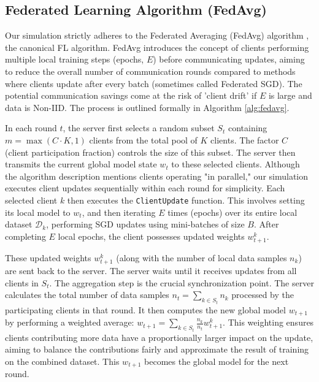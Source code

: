 \documentclass[conference]{IEEEtran}
\begin{document}
\subsection{Federated Learning Algorithm (FedAvg)}
Our simulation strictly adheres to the Federated Averaging (FedAvg) algorithm \cite{b2}, the canonical FL algorithm. FedAvg introduces the concept of clients performing multiple local training steps (epochs, $E$) before communicating updates, aiming to reduce the overall number of communication rounds compared to methods where clients update after every batch (sometimes called Federated SGD). The potential communication savings come at the risk of 'client drift' if $E$ is large and data is Non-IID. The process is outlined formally in Algorithm \ref{alg:fedavg}.

In each round $t$, the server first selects a random subset $S_t$ containing $m = \max(C \cdot K, 1)$ clients from the total pool of $K$ clients. The factor $C$ (client participation fraction) controls the size of this subset. The server then transmits the current global model state $w_t$ to these selected clients. Although the algorithm description mentions clients operating "in parallel," our simulation executes client updates sequentially within each round for simplicity. Each selected client $k$ then executes the \texttt{ClientUpdate} function. This involves setting its local model to $w_t$, and then iterating $E$ times (epochs) over its entire local dataset $\mathcal{D}_k$, performing SGD updates using mini-batches of size $B$. After completing $E$ local epochs, the client possesses updated weights $w_{t+1}^k$.

These updated weights $w_{t+1}^k$ (along with the number of local data samples $n_k$) are sent back to the server. The server waits until it receives updates from all clients in $S_t$. The aggregation step is the crucial synchronization point. The server calculates the total number of data samples $n_t = \sum_{k \in S_t} n_k$ processed by the participating clients in that round. It then computes the new global model $w_{t+1}$ by performing a weighted average: $w_{t+1} = \sum_{k \in S_t} \frac{n_k}{n_t} w_{t+1}^k$. This weighting ensures clients contributing more data have a proportionally larger impact on the update, aiming to balance the contributions fairly and approximate the result of training on the combined dataset. This $w_{t+1}$ becomes the global model for the next round.
\end{document}
